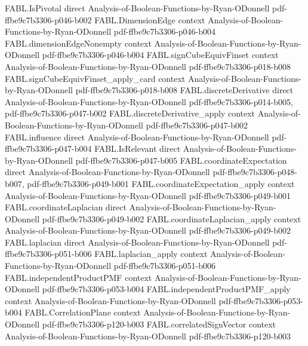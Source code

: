 \begin{theorem}
\proofstep
  {FABL.IsPivotal}
  {direct}
  {Analysis-of-Boolean-Functions-by-Ryan-ODonnell}
  {pdf-ffbe9c7b3306-p046-b002}
\proofstep
  {FABL.DimensionEdge}
  {context}
  {Analysis-of-Boolean-Functions-by-Ryan-ODonnell}
  {pdf-ffbe9c7b3306-p046-b004}
\proofstep
  {FABL.dimensionEdgeNonempty}
  {context}
  {Analysis-of-Boolean-Functions-by-Ryan-ODonnell}
  {pdf-ffbe9c7b3306-p046-b004}
\proofstep
  {FABL.signCubeEquivFinset}
  {context}
  {Analysis-of-Boolean-Functions-by-Ryan-ODonnell}
  {pdf-ffbe9c7b3306-p018-b008}
\proofstep
  {FABL.signCubeEquivFinset_apply_card}
  {context}
  {Analysis-of-Boolean-Functions-by-Ryan-ODonnell}
  {pdf-ffbe9c7b3306-p018-b008}
\proofstep
  {FABL.discreteDerivative}
  {direct}
  {Analysis-of-Boolean-Functions-by-Ryan-ODonnell}
  {pdf-ffbe9c7b3306-p014-b005,
    pdf-ffbe9c7b3306-p047-b002}
\proofstep
  {FABL.discreteDerivative_apply}
  {context}
  {Analysis-of-Boolean-Functions-by-Ryan-ODonnell}
  {pdf-ffbe9c7b3306-p047-b002}
\proofstep
  {FABL.influence}
  {direct}
  {Analysis-of-Boolean-Functions-by-Ryan-ODonnell}
  {pdf-ffbe9c7b3306-p047-b004}
\proofstep
  {FABL.IsRelevant}
  {direct}
  {Analysis-of-Boolean-Functions-by-Ryan-ODonnell}
  {pdf-ffbe9c7b3306-p047-b005}
\proofstep
  {FABL.coordinateExpectation}
  {direct}
  {Analysis-of-Boolean-Functions-by-Ryan-ODonnell}
  {pdf-ffbe9c7b3306-p048-b007,
    pdf-ffbe9c7b3306-p049-b001}
\proofstep
  {FABL.coordinateExpectation_apply}
  {context}
  {Analysis-of-Boolean-Functions-by-Ryan-ODonnell}
  {pdf-ffbe9c7b3306-p049-b001}
\proofstep
  {FABL.coordinateLaplacian}
  {direct}
  {Analysis-of-Boolean-Functions-by-Ryan-ODonnell}
  {pdf-ffbe9c7b3306-p049-b002}
\proofstep
  {FABL.coordinateLaplacian_apply}
  {context}
  {Analysis-of-Boolean-Functions-by-Ryan-ODonnell}
  {pdf-ffbe9c7b3306-p049-b002}
\proofstep
  {FABL.laplacian}
  {direct}
  {Analysis-of-Boolean-Functions-by-Ryan-ODonnell}
  {pdf-ffbe9c7b3306-p051-b006}
\proofstep
  {FABL.laplacian_apply}
  {context}
  {Analysis-of-Boolean-Functions-by-Ryan-ODonnell}
  {pdf-ffbe9c7b3306-p051-b006}
\proofstep
  {FABL.independentProductPMF}
  {context}
  {Analysis-of-Boolean-Functions-by-Ryan-ODonnell}
  {pdf-ffbe9c7b3306-p053-b004}
\proofstep
  {FABL.independentProductPMF_apply}
  {context}
  {Analysis-of-Boolean-Functions-by-Ryan-ODonnell}
  {pdf-ffbe9c7b3306-p053-b004}
\proofstep
  {FABL.CorrelationPlane}
  {context}
  {Analysis-of-Boolean-Functions-by-Ryan-ODonnell}
  {pdf-ffbe9c7b3306-p120-b003}
\proofstep
  {FABL.correlatedSignVector}
  {context}
  {Analysis-of-Boolean-Functions-by-Ryan-ODonnell}
  {pdf-ffbe9c7b3306-p120-b003}
\proofstep

\end{theorem}
